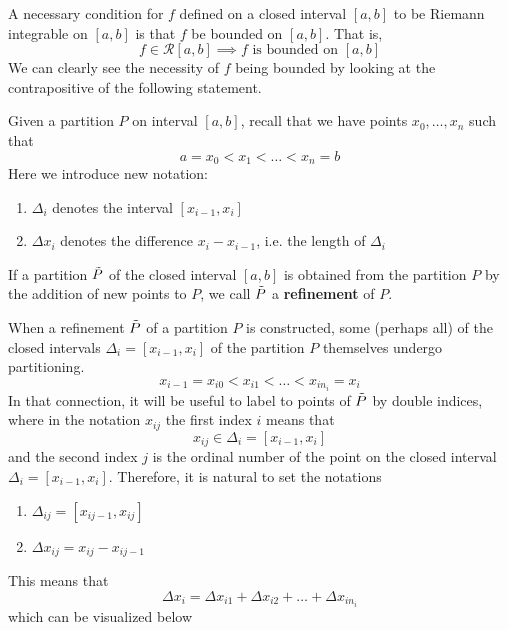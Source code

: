   \begin{theorem}
  A necessary condition for $f$ defined on a closed interval $[a, b]$ to be Riemann integrable on $[a, b]$ is that $f$ be bounded on $[a, b]$. That is, 
  \[f \in \mathcal{R}[a, b] \implies f \text{ is bounded on } [a, b]\]
  We can clearly see the necessity of $f$ being bounded by looking at the contrapositive of the following statement. 
  \end{theorem}

  \begin{theorem}[Refinement]
  Given a partition $P$ on interval $[a, b]$, recall that we have points $x_0, \ldots, x_n$ such that
  \[a = x_0 < x_1 < \ldots < x_n = b\]
  Here we introduce new notation: 
  \begin{enumerate}
    \item $\Delta_i$ denotes the interval $[x_{i-1}, x_i]$
    \item $\Delta x_i$ denotes the difference $x_i - x_{i-1}$, i.e. the length of $\Delta_i$
  \end{enumerate}
  If a partition $\Tilde{P}$ of the closed interval $[a, b]$ is obtained from the partition $P$ by the addition of new points to $P$, we call $\Tilde{P}$ a \textbf{refinement} of $P$. 

  When a refinement $\Tilde{P}$ of a partition $P$ is constructed, some (perhaps all) of the closed intervals $\Delta_i = [x_{i-1}, x_i]$ of the partition $P$ themselves undergo partitioning. 
  \[x_{i-1} = x_{i0} < x_{i1} < \ldots < x_{in_i} = x_i\]
  In that connection, it will be useful to label to points of $\Tilde{P}$ by double indices, where in the notation $x_{ij}$ the first index $i$ means that 
  \[x_{ij} \in \Delta_i = [x_{i-1}, x_i]\]
  and the second index $j$ is the ordinal number of the point on the closed interval $\Delta_i = [x_{i-1}, x_i]$. Therefore, it is natural to set the notations
  \begin{enumerate}
    \item $\Delta_{ij} = [x_{i j-1}, x_{ij}]$
    \item $\Delta x_{ij} = x_{ij} - x_{ij-1}$
  \end{enumerate}
  This means that 
  \[\Delta x_i = \Delta x_{i1} + \Delta x_{i2} + \ldots + \Delta x_{in_i}\]
  which can be visualized below

  \begin{figure}[H]
    \centering 
\end{figure}
\end{theorem}
